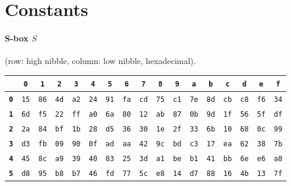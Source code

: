 \documentclass[11pt,a4paper]{article}
\begin{document}
\appendix

\section{Constants}\label{app:const}

\paragraph{S-box $S$} (row: high nibble, column: low nibble, hexadecimal).

\begin{center}\small\setlength{\tabcolsep}{3.2pt}
\begin{tabular}{@{}c|cccccccccccccccc@{}}
 & \textbf{\texttt{0}} & \textbf{\texttt{1}} & \textbf{\texttt{2}} & \textbf{\texttt{3}} & \textbf{\texttt{4}} & \textbf{\texttt{5}} & \textbf{\texttt{6}} & \textbf{\texttt{7}} & \textbf{\texttt{8}} & \textbf{\texttt{9}} & \textbf{\texttt{a}} & \textbf{\texttt{b}} & \textbf{\texttt{c}} & \textbf{\texttt{d}} & \textbf{\texttt{e}} & \textbf{\texttt{f}}\\
\hline
\textbf{\texttt{0}} & \texttt{15} & \texttt{86} & \texttt{4d} & \texttt{a2} & \texttt{24} & \texttt{91} & \texttt{fa} & \texttt{cd} & \texttt{75} & \texttt{c1} & \texttt{7e} & \texttt{8d} & \texttt{cb} & \texttt{c8} & \texttt{f6} & \texttt{34}\\
\textbf{\texttt{1}} & \texttt{6d} & \texttt{f5} & \texttt{22} & \texttt{ff} & \texttt{a0} & \texttt{6a} & \texttt{80} & \texttt{12} & \texttt{ab} & \texttt{87} & \texttt{0b} & \texttt{9d} & \texttt{1f} & \texttt{56} & \texttt{5f} & \texttt{df}\\
\textbf{\texttt{2}} & \texttt{2a} & \texttt{84} & \texttt{bf} & \texttt{1b} & \texttt{28} & \texttt{d5} & \texttt{36} & \texttt{30} & \texttt{1e} & \texttt{2f} & \texttt{33} & \texttt{6b} & \texttt{10} & \texttt{68} & \texttt{0c} & \texttt{99}\\
\textbf{\texttt{3}} & \texttt{d3} & \texttt{fb} & \texttt{09} & \texttt{90} & \texttt{0f} & \texttt{ad} & \texttt{aa} & \texttt{42} & \texttt{9c} & \texttt{bd} & \texttt{c3} & \texttt{17} & \texttt{ea} & \texttt{62} & \texttt{38} & \texttt{7b}\\
\textbf{\texttt{4}} & \texttt{45} & \texttt{8c} & \texttt{a9} & \texttt{39} & \texttt{40} & \texttt{83} & \texttt{25} & \texttt{3d} & \texttt{a1} & \texttt{be} & \texttt{b1} & \texttt{41} & \texttt{bb} & \texttt{6e} & \texttt{e6} & \texttt{a8}\\
\textbf{\texttt{5}} & \texttt{d8} & \texttt{95} & \texttt{b8} & \texttt{b7} & \texttt{46} & \texttt{fd} & \texttt{77} & \texttt{5c} & \texttt{e8} & \texttt{14} & \texttt{d7} & \texttt{88} & \texttt{16} & \texttt{4b} & \texttt{13} & \texttt{7f}\\

\end{tabular}
\end{center}
\end{document}
